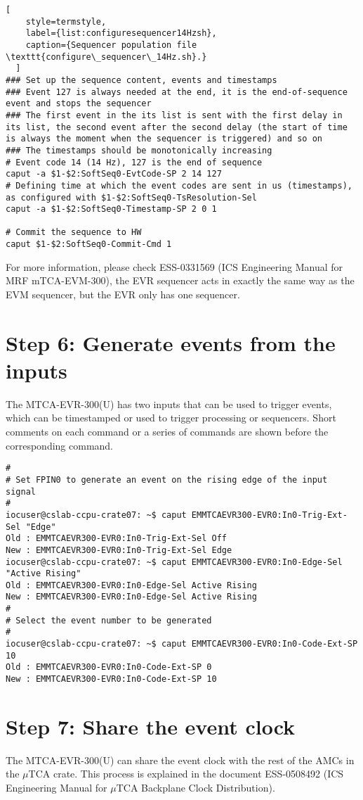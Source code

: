 \documentclass[11pt
  , a4paper
  , article
  , oneside
  , showtrims
]{memoir}
\begin{document}
{\begin{lstlisting}[
    style=termstyle,
    label={list:configuresequencer14Hzsh},
    caption={Sequencer population file \texttt{configure\_sequencer\_14Hz.sh}.}
  ]
### Set up the sequence content, events and timestamps
### Event 127 is always needed at the end, it is the end-of-sequence event and stops the sequencer
### The first event in the its list is sent with the first delay in its list, the second event after the second delay (the start of time is always the moment when the sequencer is triggered) and so on
### The timestamps should be monotonically increasing
# Event code 14 (14 Hz), 127 is the end of sequence
caput -a $1-$2:SoftSeq0-EvtCode-SP 2 14 127
# Defining time at which the event codes are sent in us (timestamps), as configured with $1-$2:SoftSeq0-TsResolution-Sel
caput -a $1-$2:SoftSeq0-Timestamp-SP 2 0 1

# Commit the sequence to HW
caput $1-$2:SoftSeq0-Commit-Cmd 1
\end{lstlisting}

For more information, please check ESS-0331569 (ICS Engineering Manual for MRF mTCA-EVM-300), the EVR sequencer acts in exactly the same way as the EVM sequencer, but the EVR only has one sequencer.


\section{Step 6: Generate events from the inputs}
The MTCA-EVR-300(U) has two inputs that can be used to trigger events, which can be timestamped or used to trigger processing or sequencers. Short comments on each command or a series of commands are shown before the corresponding command.
\begin{lstlisting}[style=termstyle]
#
# Set FPIN0 to generate an event on the rising edge of the input signal
#
iocuser@cslab-ccpu-crate07: ~$ caput EMMTCAEVR300-EVR0:In0-Trig-Ext-Sel "Edge"
Old : EMMTCAEVR300-EVR0:In0-Trig-Ext-Sel Off
New : EMMTCAEVR300-EVR0:In0-Trig-Ext-Sel Edge
iocuser@cslab-ccpu-crate07: ~$ caput EMMTCAEVR300-EVR0:In0-Edge-Sel "Active Rising"
Old : EMMTCAEVR300-EVR0:In0-Edge-Sel Active Rising
New : EMMTCAEVR300-EVR0:In0-Edge-Sel Active Rising
#
# Select the event number to be generated
#
iocuser@cslab-ccpu-crate07: ~$ caput EMMTCAEVR300-EVR0:In0-Code-Ext-SP 10
Old : EMMTCAEVR300-EVR0:In0-Code-Ext-SP 0
New : EMMTCAEVR300-EVR0:In0-Code-Ext-SP 10
\end{lstlisting}


\section{Step 7: Share the event clock}
The MTCA-EVR-300(U) can share the event clock with the rest of the AMCs in the $\mu$TCA crate. This process is explained in the document ESS-0508492 (ICS Engineering Manual for $\mu$TCA Backplane Clock Distribution).



}
\end{document}
